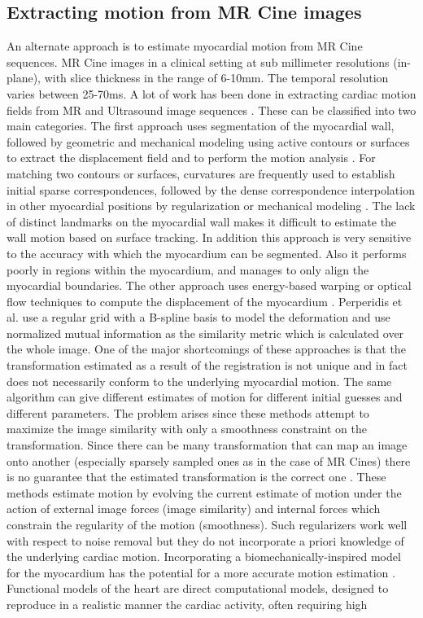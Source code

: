 \subsection{Extracting motion from MR Cine images}
An alternate approach is to estimate myocardial motion from MR Cine sequences. MR Cine images in a clinical setting at sub millimeter resolutions (in-plane), with slice thickness in the range of 6-10mm. The temporal resolution varies between 25-70ms. A lot of work has been done in extracting cardiac motion fields from MR and Ultrasound image sequences \cite{ Shi99,  ledesma01, McE00, Papa01, perperidis04,  Song91,  Wang01}. These can be classified into two main categories. The first approach uses segmentation of the myocardial wall, followed by geometric and mechanical modeling using active contours or surfaces to extract the displacement field and to perform the motion analysis \cite{ Shi99,  Papa01,  Wang01}. For matching two contours or surfaces, curvatures are frequently used to establish initial sparse correspondences, followed by the dense correspondence interpolation in other myocardial positions by regularization or mechanical modeling \cite{ Shi99, McE00}. The lack of distinct landmarks on the myocardial wall makes it difficult to estimate the wall motion based on surface tracking. In addition this approach is very sensitive to the accuracy with which the myocardium can be segmented. Also it performs poorly in regions within the myocardium, and manages to only align the myocardial boundaries. The other approach uses energy-based warping or optical flow techniques to compute the displacement of the myocardium \cite{ ledesma01,  perperidis04,  Song91}. Perperidis et al. \cite{ perperidis04} use a regular grid with a B-spline basis to model the deformation and use normalized mutual information as the similarity metric which is calculated over the whole image. One of the major shortcomings of these approaches is that the transformation estimated as a result of the registration is not unique and in fact does not necessarily conform to the underlying myocardial motion. The same algorithm can give different estimates of motion for different initial guesses and different parameters. The problem arises since these methods attempt to maximize the image similarity with only a smoothness constraint on the transformation. Since there can be many transformation that can map an image onto another (especially sparsely sampled ones as in the case of MR Cines) there is no guarantee that the estimated transformation is the correct one \cite{ Cachier:MICCAI:01,  Cachier-JMIV-2004}. These methods estimate motion by evolving the current estimate of motion under the action of external image forces (image similarity) and internal forces which constrain the regularity of the motion (smoothness). Such regularizers work well with respect to noise removal but they do not incorporate a priori knowledge of the underlying cardiac motion. Incorporating a biomechanically-inspired model for the myocardium has the potential for a more accurate motion estimation \cite{mcculloch1998cbh}. Functional models of the heart are direct computational models, designed to reproduce in a realistic manner the cardiac activity, often requiring high 